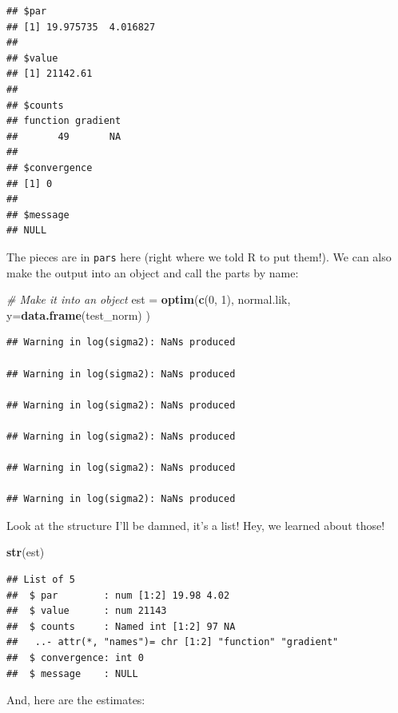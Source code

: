 \documentclass[
]{book}
\newenvironment{Shaded}{\begin{snugshade}}{\end{snugshade}}
\newcommand{\CommentTok}[1]{\textcolor[rgb]{0.56,0.35,0.01}{\textit{#1}}}
\newcommand{\DataTypeTok}[1]{\textcolor[rgb]{0.13,0.29,0.53}{#1}}
\newcommand{\DecValTok}[1]{\textcolor[rgb]{0.00,0.00,0.81}{#1}}
\newcommand{\KeywordTok}[1]{\textcolor[rgb]{0.13,0.29,0.53}{\textbf{#1}}}
\newcommand{\NormalTok}[1]{#1}
\newcommand{\OperatorTok}[1]{\textcolor[rgb]{0.81,0.36,0.00}{\textbf{#1}}}
\newcommand{\StringTok}[1]{\textcolor[rgb]{0.31,0.60,0.02}{#1}}
\begin{document}
\begin{verbatim}
## $par
## [1] 19.975735  4.016827
## 
## $value
## [1] 21142.61
## 
## $counts
## function gradient 
##       49       NA 
## 
## $convergence
## [1] 0
## 
## $message
## NULL
\end{verbatim}

The pieces are in \texttt{pars} here (right where we told R to put them!). We can also make the output into an object and call the parts by name:

\begin{Shaded}
\begin{Highlighting}[]
\CommentTok{# Make it into an object}
\NormalTok{est =}\StringTok{ }\KeywordTok{optim}\NormalTok{(}\KeywordTok{c}\NormalTok{(}\DecValTok{0}\NormalTok{, }\DecValTok{1}\NormalTok{),}
\NormalTok{            normal.lik,}
            \DataTypeTok{y=}\KeywordTok{data.frame}\NormalTok{(test_norm)}
\NormalTok{            ) }
\end{Highlighting}
\end{Shaded}

\begin{verbatim}
## Warning in log(sigma2): NaNs produced

## Warning in log(sigma2): NaNs produced

## Warning in log(sigma2): NaNs produced

## Warning in log(sigma2): NaNs produced

## Warning in log(sigma2): NaNs produced

## Warning in log(sigma2): NaNs produced
\end{verbatim}

Look at the structure I'll be damned, it's a list! Hey, we learned about those!

\begin{Shaded}
\begin{Highlighting}[]
\KeywordTok{str}\NormalTok{(est)   }
\end{Highlighting}
\end{Shaded}

\begin{verbatim}
## List of 5
##  $ par        : num [1:2] 19.98 4.02
##  $ value      : num 21143
##  $ counts     : Named int [1:2] 97 NA
##   ..- attr(*, "names")= chr [1:2] "function" "gradient"
##  $ convergence: int 0
##  $ message    : NULL
\end{verbatim}

And, here are the estimates:

\begin{Shaded}
\end{Shaded}
\end{document}
